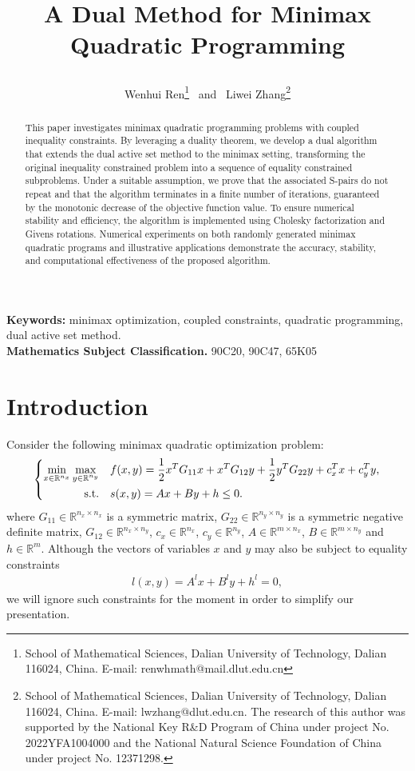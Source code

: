 \documentclass{article}
\title{A Dual Method for Minimax Quadratic Programming
\author{Wenhui Ren\thanks{\baselineskip 9pt School of Mathematical Sciences, Dalian University of Technology, Dalian 116024, China. E-mail: renwhmath@mail.dlut.edu.cn} \
 and \ Liwei Zhang\thanks{\baselineskip 9pt
		School of Mathematical Sciences, Dalian University of Technology, Dalian 116024, China. E-mail: lwzhang@dlut.edu.cn. The
		research of this author was supported by the National Key R\&D Program of China under project No. 2022YFA1004000 and the National Natural Science Foundation of China under project  No. 12371298.}}
}
\begin{document}
	\maketitle
	\begin{abstract}
		This paper investigates minimax quadratic programming problems with coupled inequality constraints. By leveraging a duality theorem, we develop a dual algorithm that extends the dual active set method to the minimax setting, transforming the original inequality constrained problem into a sequence of equality constrained subproblems. 
		Under a suitable assumption, we prove that the associated S-pairs do not repeat and that the algorithm terminates in a finite number of iterations, guaranteed by the monotonic decrease of the objective function value. To ensure numerical stability and efficiency, the algorithm is implemented using Cholesky factorization and Givens rotations. Numerical experiments on both randomly generated minimax quadratic programs and illustrative applications demonstrate the accuracy, stability, and computational effectiveness of the proposed algorithm.
	\end{abstract}
	
	{\bf Keywords:} minimax optimization, coupled constraints,
	quadratic programming, dual active set method.\\
	
	{\bf Mathematics Subject Classification.} 90C20, 90C47, 65K05\\

	\baselineskip 18pt
	\parskip 2pt
	
	\section{Introduction}
	Consider the following minimax quadratic optimization problem:
	\begin{align}\label{a1.1}
		\left\lbrace
		\begin{aligned}
			\min_{x\in\mathbb{R}^{n_{x}}}\max_{y\in\mathbb{R}^{n_{y}}}\quad& f(x, y) = \frac{1}{2}x^{T}G_{11}x + x^{T}G_{12}y + \frac{1}{2}y^{T}G_{22}y + c_{x}^{T}x + c_{y}^{T}y,\\
			{\rm s.t.}\quad & s(x, y) = Ax + By + h \leq 0.
		\end{aligned}\right.
	\end{align}
	where $G_{11} \in \mathbb{R}^{n_{x} \times n_{x}}$ is a symmetric matrix, $G_{22} \in \mathbb{R}^{n_{y} \times n_{y}}$ is a symmetric negative definite matrix, $G_{12} \in \mathbb{R}^{n_{x} \times n_{y}}$, $c_{x} \in \mathbb{R}^{n_{x}}$, $c_{y} \in \mathbb{R}^{n_{y}}$, $A \in \mathbb{R}^{m \times n_{x}}$, $B \in \mathbb{R}^{m \times n_{y}}$ and $h \in \mathbb{R}^{m}$. Although the vectors of variables $x$ and $y$ may also be subject to equality constraints
	\begin{align*}
		l(x, y) = A^{l}x + B^{l}y + h^{l} = 0,
	\end{align*}
	we will ignore such constraints for the moment in order to simplify our presentation.
	
\end{document}
